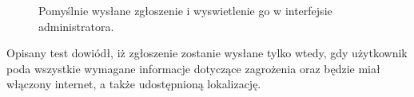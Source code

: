 \setlength{\fboxrule}{0.5pt}
\begin{figure}[H]
    \centering
    \caption{Pomyślnie wysłane zgłoszenie i wyswietlenie go w interfejsie administratora.}
    \label{test:zglos5}
\end{figure}
Opisany test dowiódł, iż zgłoszenie zostanie wysłane tylko wtedy, gdy użytkownik poda wszystkie wymagane informacje dotyczące zagrożenia oraz będzie miał włączony internet, a także udostępnioną lokalizację.
